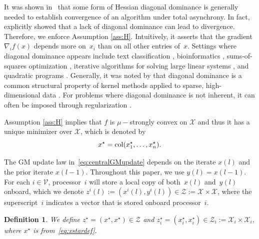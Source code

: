 \documentclass[9pt,shortpaper,twoside,web]{ieeecolor}
\newcommand{\X}{\ensuremath{\mathcal{X}}\xspace}
\newcommand{\Z}{\ensuremath{\mathcal{Z}}\xspace}
\newcommand{\V}{\ensuremath{\mathcal{V}}\xspace}
\newcommand{\col}[2]{\textnormal{col}(#1,#2)}
\newcommand{\blue}[1]{{\textcolor{blue}{#1}}}
\newtheorem{definition}{Definition}
\begin{document}
It was shown in~\cite[Section 6.3.2]{bertsekas1989parallel} that 
    some form of Hessian diagonal dominance is 
    generally needed to establish convergence of an algorithm under total asynchrony. 
    In fact, \cite[p. 438]{bertsekas1989parallel} explicitly showed that
    a lack of diagonal dominance can lead to divergence. 
    Therefore, we enforce Assumption \ref{ass:H}. 
    Intuitively, it asserts that the gradient~$\nabla_i f(x)$
    depends more on~$x_i$ than on all other entries of~$x$. 
    Settings where diagonal dominance appears include text classification \cite{greene2006practical}, bioinformatics \cite{scholkopf2002kernel}, sums-of-squares optimization \cite{ahmadi2015sum}, iterative algorithms for solving large linear systems \cite{cai2019fast,gremban1996combinatorial}, 
    and quadratic programs \cite{ubl2021totally}.
    Generally, it was noted by \cite{greene2006practical,cancedda2003word,scholkopf2002kernel} that diagonal dominance is a common structural property of kernel methods applied to sparse, high-dimensional data \cite{greene2006practical,cancedda2003word,scholkopf2002kernel}.
    For problems where diagonal dominance is not inherent, it can often be imposed through regularization \cite{hendrickson2022totally,koshal2011multiuser}.

Assumption \ref{ass:H} implies that $f$ is $\mu-$strongly convex on $\X$
and thus it has a unique minimizer over $\X$, which is denoted by
\begin{equation} \label{eq:xstardef}
x^\star=\col{x_1^\star,\dots}{x_n^\star}.
\end{equation}


The GM update law in~\eqref{eq:centralGMupdate}
depends on the iterate $x(l)$ and the prior iterate $x(l-1)$. 
Throughout this paper, we use $y(l) = x(l-1)$.
For each $i\in \V$, processor~$i$ will store a local copy of both~$x(l)$ and~$y(l)$ onboard, 
which we denote $z^i(l):=(x^i(l),y^i(l))\in \Z := \X\times\X$, where
the superscript~$i$ indicates a vector that is stored onboard processor~$i$.
\begin{definition}\label{def:zstar}    
    We define $z^\star=(x^\star,x^\star)\in \Z$ and $z^\star_i=(x^\star_i,x^\star_i)\in \Z_i := \X_i \times \X_i$, where
    $x^\star$ is from~\eqref{eq:xstardef}. 
\end{definition}
\end{document}
